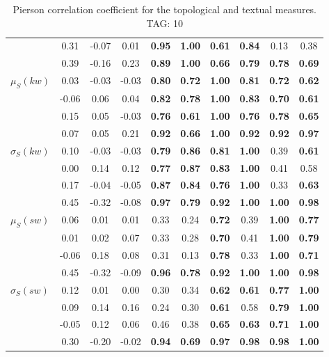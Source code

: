 \begin{table*}[h!]
\begin{center}
\begin{tabular}{| l || c | c | c | c | c | c | c | c | c |}
 & 0.31 & -0.07 & 0.01 & {\bf 0.95} & {\bf 1.00} & {\bf 0.61} & {\bf 0.84} & 0.13 & 0.38 \\
 & 0.39 & -0.16 & 0.23 & {\bf 0.89} & {\bf 1.00} & {\bf 0.66} & {\bf 0.79} & {\bf 0.78} & {\bf 0.69} \\\hline
$\mu_S(kw)$ & 0.03 & -0.03 & -0.03 & {\bf 0.80} & {\bf 0.72} & {\bf 1.00} & {\bf 0.81} & {\bf 0.72} & {\bf 0.62} \\
 & -0.06 & 0.06 & 0.04 & {\bf 0.82} & {\bf 0.78} & {\bf 1.00} & {\bf 0.83} & {\bf 0.70} & {\bf 0.61} \\
 & 0.15 & 0.05 & -0.03 & {\bf 0.76} & {\bf 0.61} & {\bf 1.00} & {\bf 0.76} & {\bf 0.78} & {\bf 0.65} \\
 & 0.07 & 0.05 & 0.21 & {\bf 0.92} & {\bf 0.66} & {\bf 1.00} & {\bf 0.92} & {\bf 0.92} & {\bf 0.97} \\\hline
$\sigma_S(kw)$ & 0.10 & -0.03 & -0.03 & {\bf 0.79} & {\bf 0.86} & {\bf 0.81} & {\bf 1.00} & 0.39 & {\bf 0.61} \\
 & 0.00 & 0.14 & 0.12 & {\bf 0.77} & {\bf 0.87} & {\bf 0.83} & {\bf 1.00} & 0.41 & 0.58 \\
 & 0.17 & -0.04 & -0.05 & {\bf 0.87} & {\bf 0.84} & {\bf 0.76} & {\bf 1.00} & 0.33 & {\bf 0.63} \\
 & 0.45 & -0.32 & -0.08 & {\bf 0.97} & {\bf 0.79} & {\bf 0.92} & {\bf 1.00} & {\bf 1.00} & {\bf 0.98} \\\hline
$\mu_S(sw)$ & 0.06 & 0.01 & 0.01 & 0.33 & 0.24 & {\bf 0.72} & 0.39 & {\bf 1.00} & {\bf 0.77} \\
 & 0.01 & 0.02 & 0.07 & 0.33 & 0.28 & {\bf 0.70} & 0.41 & {\bf 1.00} & {\bf 0.79} \\
 & -0.06 & 0.18 & 0.08 & 0.31 & 0.13 & {\bf 0.78} & 0.33 & {\bf 1.00} & {\bf 0.71} \\
 & 0.45 & -0.32 & -0.09 & {\bf 0.96} & {\bf 0.78} & {\bf 0.92} & {\bf 1.00} & {\bf 1.00} & {\bf 0.98} \\\hline
$\sigma_S(sw)$ & 0.12 & 0.01 & 0.00 & 0.30 & 0.34 & {\bf 0.62} & {\bf 0.61} & {\bf 0.77} & {\bf 1.00} \\
 & 0.09 & 0.14 & 0.16 & 0.24 & 0.30 & {\bf 0.61} & 0.58 & {\bf 0.79} & {\bf 1.00} \\
 & -0.05 & 0.12 & 0.06 & 0.46 & 0.38 & {\bf 0.65} & {\bf 0.63} & {\bf 0.71} & {\bf 1.00} \\
 & 0.30 & -0.20 & -0.02 & {\bf 0.94} & {\bf 0.69} & {\bf 0.97} & {\bf 0.98} & {\bf 0.98} & {\bf 1.00} \\\hline
\end{tabular}
\caption{Pierson correlation coefficient for the topological and textual measures. TAG: 10}
\end{center}
\end{table*}
